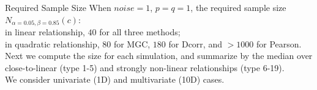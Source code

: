 \documentclass[mathserif,t]{beamer}
\newcommand{\Mgc}{MGC}
\begin{document}



\begin{frame}{Required Sample Size}
\pause
When $noise=1$, $p=q=1$, the required sample size $N_{\alpha=0.05,\beta=0.85}(c)$: \\
\medskip
\pause
in linear relationship, $40$ for all three methods; \\
in quadratic relationship, $80$ for \Mgc, $180$ for Dcorr, and $>1000$ for Pearson.\\

\medskip
\pause
Next we compute the size for each simulation, and summarize by the median over close-to-linear (type 1-5) and strongly non-linear relationships (type 6-19). \\

\medskip
\pause
We consider univariate (1D) and multivariate (10D) cases.\\ %
\end{frame}
\end{document}
